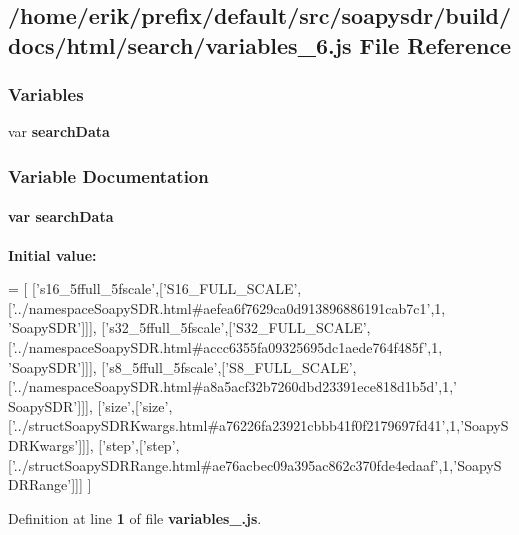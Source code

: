 \subsection{/home/erik/prefix/default/src/soapysdr/build/docs/html/search/variables\+\_\+6.js File Reference}
\label{variables__6_8js}
\subsubsection*{Variables}
\begin{DoxyCompactItemize}
\item 
var {\bf search\+Data}
\end{DoxyCompactItemize}


\subsubsection{Variable Documentation}
\paragraph[{search\+Data}]{\setlength{\rightskip}{0pt plus 5cm}var search\+Data}\label{variables__6_8js_ad01a7523f103d6242ef9b0451861231e}
{\bfseries Initial value\+:}
\begin{DoxyCode}
=
[
  [\textcolor{stringliteral}{'s16\_5ffull\_5fscale'},[\textcolor{stringliteral}{'S16\_FULL\_SCALE'},[\textcolor{stringliteral}{'../namespaceSoapySDR.html#aefea6f7629ca0d913896886191cab7c1'},1,\textcolor{stringliteral}{
      'SoapySDR'}]]],
  [\textcolor{stringliteral}{'s32\_5ffull\_5fscale'},[\textcolor{stringliteral}{'S32\_FULL\_SCALE'},[\textcolor{stringliteral}{'../namespaceSoapySDR.html#accc6355fa09325695dc1aede764f485f'},1,\textcolor{stringliteral}{
      'SoapySDR'}]]],
  [\textcolor{stringliteral}{'s8\_5ffull\_5fscale'},[\textcolor{stringliteral}{'S8\_FULL\_SCALE'},[\textcolor{stringliteral}{'../namespaceSoapySDR.html#a8a5acf32b7260dbd23391ece818d1b5d'},1,\textcolor{stringliteral}{'
      SoapySDR'}]]],
  [\textcolor{stringliteral}{'size'},[\textcolor{stringliteral}{'size'},[\textcolor{stringliteral}{'../structSoapySDRKwargs.html#a76226fa23921cbbb41f0f2179697fd41'},1,\textcolor{stringliteral}{'SoapySDRKwargs'}]]],
  [\textcolor{stringliteral}{'step'},[\textcolor{stringliteral}{'step'},[\textcolor{stringliteral}{'../structSoapySDRRange.html#ae76acbec09a395ac862c370fde4edaaf'},1,\textcolor{stringliteral}{'SoapySDRRange'}]]]
]
\end{DoxyCode}


Definition at line {\bf 1} of file {\bf variables\+\_.\+js}.

